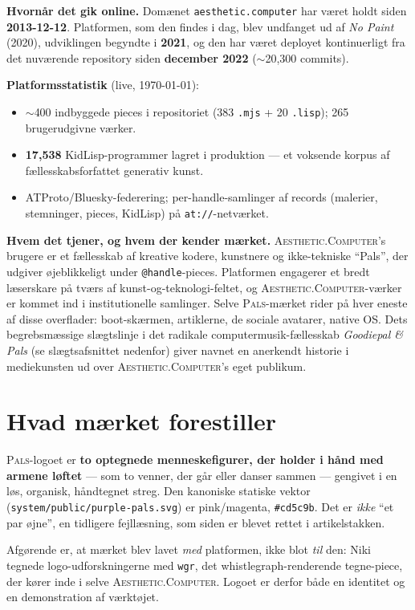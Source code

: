 \documentclass[10pt,letterpaper,twocolumn]{article}
\newcommand{\ac}{\textsc{Aesthetic}{\color{acpink}.}\textsc{Computer}}
\newcommand{\pals}{\textsc{Pals}}
\begin{document}
\textbf{Hvornår det gik online.} Domænet \texttt{aesthetic.computer} har
været holdt siden \textbf{2013-12-12}. Platformen, som den findes i dag,
blev undfanget ud af \emph{No Paint} (2020), udviklingen begyndte i
\textbf{2021}, og den har været deployet kontinuerligt fra det nuværende
repository siden \textbf{december 2022} ($\sim$20{,}300 commits).

\textbf{Platformsstatistik} (live, \today):
\begin{itemize}
  \item $\sim$400 indbyggede pieces i repositoriet (383 \texttt{.mjs} + 20
        \texttt{.lisp}); 265 brugerudgivne værker.
  \item \textbf{17{,}538} KidLisp-programmer lagret i produktion --- et
        voksende korpus af fællesskabsforfattet generativ kunst.
  \item ATProto/Bluesky-federering; per-handle-samlinger af records
        (malerier, stemninger, pieces, KidLisp) på \texttt{at://}-netværket.
\end{itemize}

\textbf{Hvem det tjener, og hvem der kender mærket.} \ac{}'s brugere er et
fællesskab af kreative kodere, kunstnere og ikke-tekniske ``Pals'', der
udgiver øjeblikkeligt under \texttt{@handle}-pieces. Platformen engagerer et
bredt læserskare på tværs af kunst-og-teknologi-feltet, og \ac{}-værker er
kommet ind i institutionelle samlinger. Selve
\pals{}-mærket rider på hver eneste af disse overflader: boot-skærmen,
artiklerne, de sociale avatarer, native OS. Dets begrebsmæssige slægtslinje
i det radikale computermusik-fællesskab \emph{Goodiepal \& Pals} (se
slægtsafsnittet nedenfor) giver navnet en anerkendt historie i medie\-kunsten
ud over \ac{}'s eget publikum.

\section{Hvad mærket forestiller}

\pals{}-logoet er \textbf{to optegnede menneskefigurer, der holder i hånd
med armene løftet} --- som to venner, der går eller danser sammen ---
gengivet i en løs, organisk, håndtegnet streg. Den kanoniske statiske
vektor (\texttt{system/public/purple-pals.svg}) er pink/magenta,
\texttt{\#cd5c9b}. Det er \emph{ikke} ``et par øjne'', en tidligere
fejllæsning, som siden er blevet rettet i artikelstakken.

Afgørende er, at mærket blev lavet \emph{med} platformen, ikke blot
\emph{til} den: Niki tegnede logo-udforskningerne med \texttt{wgr}, det
whistlegraph-renderende tegne-piece, der kører inde i selve \ac{}. Logoet
er derfor både en identitet og en demonstration af værktøjet.
\end{document}
